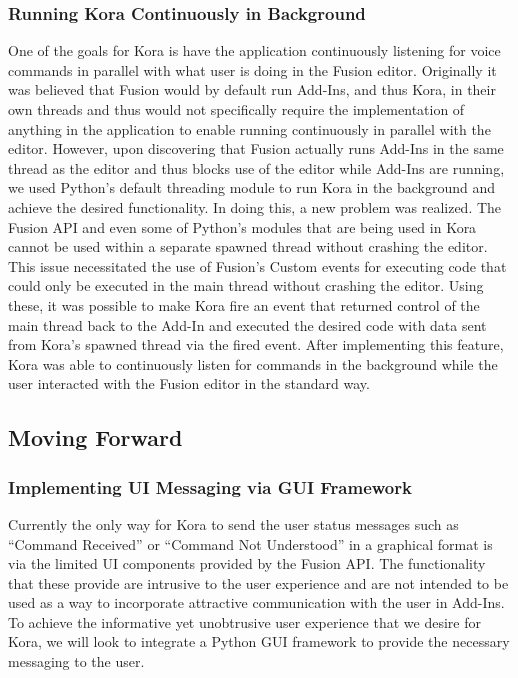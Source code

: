 \documentclass[onecolumn, draftclsnofoot,10pt, compsoc]{IEEEtran}
\begin{document}
	    \subsubsection{Running Kora Continuously in Background}
	   		One of the goals for Kora is have the application continuously listening for voice commands in parallel with what user is doing in the Fusion editor.
		    Originally it was believed that Fusion would by default run Add-Ins, and thus Kora, in their own threads and thus would not specifically require the implementation of anything in the application to enable running continuously in parallel with the editor.
		    However, upon discovering that Fusion actually runs Add-Ins in the same thread as the editor and thus blocks use of the editor while Add-Ins are running, we used Python's default threading module to run Kora in the background and achieve the desired functionality.
		    In doing this, a new problem was realized.
		    The Fusion API and even some of Python's modules that are being used in Kora cannot be used within a separate spawned thread without crashing the editor.
		    This issue necessitated the use of Fusion's Custom events for executing code that could only be executed in the main thread without crashing the editor.
		    Using these, it was possible to make Kora fire an event that returned control of the main thread back to the Add-In and executed the desired code with data sent from Kora's spawned thread via the fired event.
	    	After implementing this feature, Kora was able to continuously listen for commands in the background while the user interacted with the Fusion editor in the standard way.

		
	\subsection{Moving Forward}
    	\subsubsection{Implementing UI Messaging via GUI Framework}	
		    Currently the only way for Kora to send the user status messages such as “Command Received” or “Command Not Understood” in a graphical format is via the limited UI components provided by the Fusion API.
		    The functionality that these provide are intrusive to the user experience and are not intended to be used as a way to incorporate attractive communication with the user in Add-Ins.
		    To achieve the informative yet unobtrusive user experience that we desire for Kora, we will look to integrate a Python GUI framework to provide the necessary messaging to the user.
\end{document}
